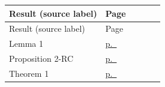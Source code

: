 \begin{center}\footnotesize
\begin{longtable}{@{}L{0.62\linewidth}l@{}}
\toprule Result (source label) & Page \\ \midrule\endfirsthead
\toprule Result (source label) & Page \\ \midrule\endhead
Lemma 1 & \hyperref[pA-res-lemma-1]{p.~\pageref{pA-res-lemma-1}} \\
Proposition 2-RC & \hyperref[pA-res-proposition-2-RC]{p.~\pageref{pA-res-proposition-2-RC}} \\
Theorem 1 & \hyperref[pA-res-theorem-1]{p.~\pageref{pA-res-theorem-1}} \\
\bottomrule
\end{longtable}
\end{center}
